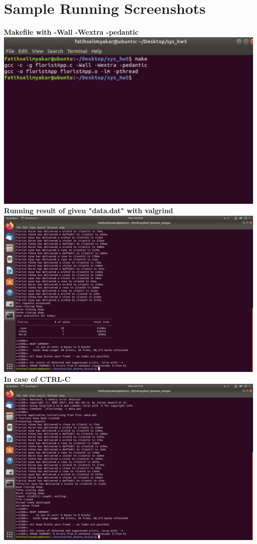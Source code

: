 \documentclass{article}
\begin{document}
\newpage

\section{Sample Running Screenshots \\}
\begin{center}
    \textbf{Makefile with -Wall -Wextra -pedantic \\}
    \includegraphics[scale=0.6]{makefile.png} \\[0.5in]
    \textbf{Running result of given "data.dat" with valgrind} \\
    \includegraphics[scale=0.3]{valgrind.png}
    \newpage
    \textbf{In case of CTRL-C} \\
    \includegraphics[scale=0.3]{ctrl.png} \\[0.5in]

\end{center}
\end{document}

